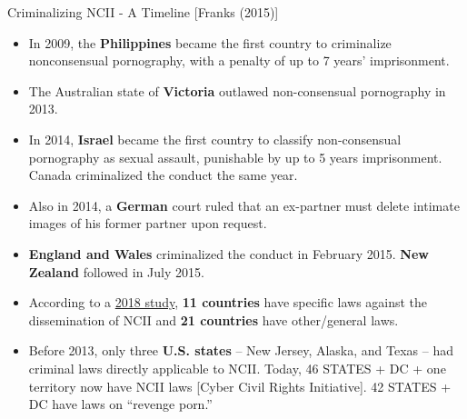 \documentclass[nobackground,dvipsnames,table,aspectratio=169]{beamer}
\begin{document}
\begin{frame}{Criminalizing NCII - A Timeline [Franks (2015)]}
    \small
    \begin{itemize}
        \item In 2009, the \textbf{Philippines} became the first country to criminalize nonconsensual pornography, with a penalty of up to 7 years’ imprisonment.
        \item The Australian state of \textbf{Victoria} outlawed non-consensual pornography in 2013.
        \item In 2014, \textbf{Israel} became the first country to classify non-consensual pornography as sexual assault, punishable by up to 5 years imprisonment. Canada criminalized the conduct the same year.
        \item Also in 2014, a \textbf{German} court ruled that an ex-partner must delete intimate images of his former partner upon request.
        \item \textbf{England and Wales} criminalized the conduct in February 2015. \textbf{New Zealand} followed in July 2015.
        \item According to a \href{https://www.internetlab.org.br/wp-content/uploads/2018/11/Fighting_the_Dissemination_of_Non.pdf}{2018 study}, \textbf{11 countries} have specific laws against the dissemination of NCII and \textbf{21 countries} have other/general laws.
        \item Before 2013, only three \textbf{U.S. states} – New Jersey, Alaska, and Texas – had criminal laws directly applicable to NCII. Today, 46 STATES + DC + one territory now have NCII laws [Cyber Civil Rights Initiative]. 42 STATES + DC have laws on “revenge porn.”
    \end{itemize}
\end{frame}
\end{document}
